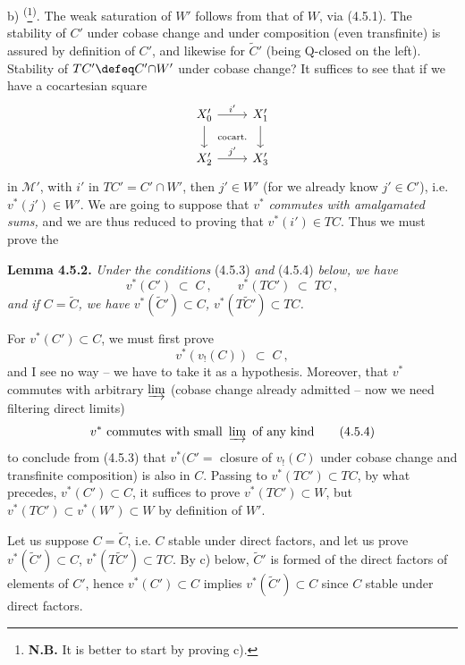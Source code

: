b) \textsuperscript{(}\footnote[19]{\textbf{N.B.} It is better to start by proving c).}\textsuperscript{)}. The weak saturation of $W'$ follows from that of $W$, via (4.5.1). The stability of $C'$ under cobase change and under composition (even transfinite) is assured by definition of $C'$, and likewise for $\tilde{C}'$ (being Q-closed on the left). Stability of $TC' \defeq C'{\cap}W'$ under cobase change? It suffices to see that if we have a cocartesian square
\[
\begin{tikzcd}
X'_0 \arrow[r, "i'"] \arrow[d] \arrow[dr, phantom, "\text{\scriptsize cocart.}"] & X'_1 \arrow[d] \\
X'_2 \arrow[r, "j'"] & X'_3
\end{tikzcd}
\]
in $\mathcal{M}'$, with $i'$ in $TC' = C' \cap W'$, then $j' \in W'$ (for we already know $j' \in C'$), i.e.
\marginpar{$||$}%
$v^*(j') \in W'$. We are going to suppose that $v^*$ \textit{commutes with amalgamated sums,} and we are thus reduced to proving that $v^*(i') \in TC$. Thus %
we must prove the

\textbf{Lemma 4.5.2.} \textit{Under the conditions} (4.5.3) \textit{and} (4.5.4) \textit{below, we have}
\[
v^*(C') \;\subset\; C\ , \qquad v^*(TC') \;\subset\; TC\ ,
\]
\textit{and if $C = \tilde{C}$, we have $v^*(\tilde{C}') \subset C$, $v^*(T\tilde{C}') \subset TC$.}

For $v^*(C') \subset C$, we must first prove
\[
v^*(v_!(C)) \;\subset\; C\ , \tag*{(4.5.3)}
\]
and I see no way -- we have to take it as a hypothesis. Moreover, that $v^*$ commutes with arbitrary $\varinjlim$ (cobase change already admitted -- now we need filtering direct limits)
\[
v^* \text{ commutes with small } \varinjlim \text{ of any kind} \tag*{(4.5.4)}
\]
to conclude from (4.5.3) that $v^*(C' =$ closure of $v_!(C)$ under cobase change and transfinite composition) is also in $C$. Passing to $v^*(TC') \subset TC$, by what precedes, $v^*(C') \subset C$, it suffices to prove $v^*(TC') \subset W$, but $v^*(TC') \subset v^*(W') \subset W$ by definition of $W'$.

Let us suppose $C = \tilde{C}$, i.e. $C$ stable under direct factors, and let us prove $v^*(\tilde{C}') \subset C$, $v^*(T\tilde{C}') \subset TC$. By c) below, $\tilde{C}'$ is formed of the direct factors
of elements of $C'$, hence $v^*(C') \subset C$ implies $v^*(\tilde{C}') \subset C$ since $C$ stable under direct factors.

